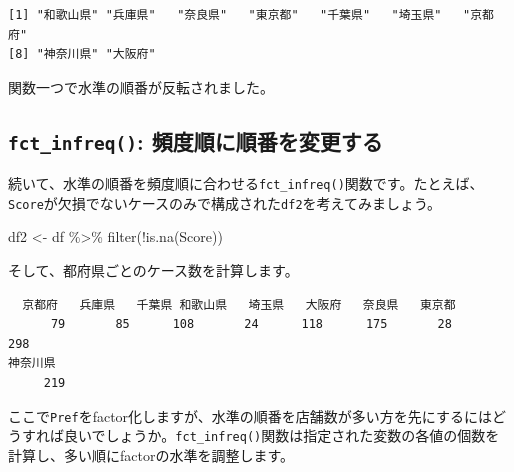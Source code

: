 \documentclass[
  a4paper,
  pandoc,
  ja=standard,
  jafont=haranoaji]{bxjsbook}
\newenvironment{Shaded}{\begin{snugshade}}{\end{snugshade}}
\newcommand{\AttributeTok}[1]{\textcolor[rgb]{0.00,0.48,0.65}{#1}}
\newcommand{\CommentTok}[1]{\textcolor[rgb]{0.37,0.37,0.37}{#1}}
\newcommand{\FunctionTok}[1]{\textcolor[rgb]{0.28,0.35,0.67}{#1}}
\newcommand{\NormalTok}[1]{\textcolor[rgb]{0.00,0.48,0.65}{#1}}
\newcommand{\OtherTok}[1]{\textcolor[rgb]{0.00,0.48,0.65}{#1}}
\newcommand{\SpecialCharTok}[1]{\textcolor[rgb]{0.37,0.37,0.37}{#1}}
\begin{document}
\begin{verbatim}
[1] "和歌山県" "兵庫県"   "奈良県"   "東京都"   "千葉県"   "埼玉県"   "京都府"  
[8] "神奈川県" "大阪府"  
\end{verbatim}

関数一つで水準の順番が反転されました。

\hypertarget{fct_infreq-ux983bux5ea6ux9806ux306bux9806ux756aux3092ux5909ux66f4ux3059ux308b}{%
\subsection{\texorpdfstring{\texttt{fct\_infreq()}:
頻度順に順番を変更する}{fct\_infreq(): 頻度順に順番を変更する}}\label{fct_infreq-ux983bux5ea6ux9806ux306bux9806ux756aux3092ux5909ux66f4ux3059ux308b}}

続いて、水準の順番を頻度順に合わせる\texttt{fct\_infreq()}関数です。たとえば、\texttt{Score}が欠損でないケースのみで構成された\texttt{df2}を考えてみましょう。

\begin{Shaded}
\begin{Highlighting}[numbers=left,,]
\NormalTok{df2 }\OtherTok{\textless{}{-}}\NormalTok{ df }\SpecialCharTok{\%\textgreater{}\%}
  \FunctionTok{filter}\NormalTok{(}\SpecialCharTok{!}\FunctionTok{is.na}\NormalTok{(Score))}
\end{Highlighting}
\end{Shaded}

そして、都府県ごとのケース数を計算します。

\begin{Shaded}
\end{Shaded}

\begin{verbatim}
  京都府   兵庫県   千葉県 和歌山県   埼玉県   大阪府   奈良県   東京都 
      79       85      108       24      118      175       28      298 
神奈川県 
     219 
\end{verbatim}

ここで\texttt{Pref}をfactor化しますが、水準の順番を店舗数が多い方を先にするにはどうすれば良いでしょうか。\texttt{fct\_infreq()}関数は指定された変数の各値の個数を計算し、多い順にfactorの水準を調整します。

\begin{Shaded}
\end{Shaded}
\end{document}

